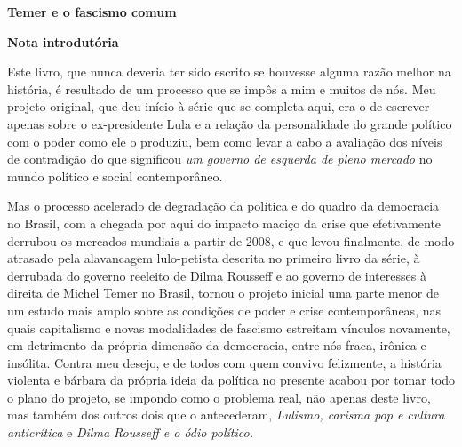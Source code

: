 \textbf{Temer e o fascismo comum }
















\textbf{Nota introdutória}

Este livro, que nunca deveria ter sido escrito se houvesse alguma razão
melhor na história, é resultado de um processo que se impôs a mim e
muitos de nós. Meu projeto original, que deu início à série que se
completa aqui, era o de escrever apenas sobre o ex-presidente Lula e a
relação da personalidade do grande político com o poder como ele o
produziu, bem como levar a cabo a avaliação dos níveis de contradição do
que significou \emph{um governo de esquerda de pleno mercado} no mundo
político e social contemporâneo.

Mas o processo acelerado de degradação da política e do quadro da
democracia no Brasil, com a chegada por aqui do impacto maciço da crise
que efetivamente derrubou os mercados mundiais a partir de 2008, e que
levou finalmente, de modo atrasado pela alavancagem lulo-petista
descrita no primeiro livro da série, à derrubada do governo reeleito de
Dilma Rousseff e ao governo de interesses à direita de Michel Temer no
Brasil, tornou o projeto inicial uma parte menor de um estudo mais amplo
sobre as condições de poder e crise contemporâneas, nas quais
capitalismo e novas modalidades de fascismo estreitam vínculos
novamente, em detrimento da própria dimensão da democracia, entre nós
fraca, irônica e insólita. Contra meu desejo, e de todos com quem
convivo felizmente, a história violenta e bárbara da própria ideia da
política no presente acabou por tomar todo o plano do projeto, se
impondo como o problema real, não apenas deste livro, mas também dos
outros dois que o antecederam, \emph{Lulismo, carisma pop e cultura
anticrítica} e \emph{Dilma Rousseff e o ódio político. }

